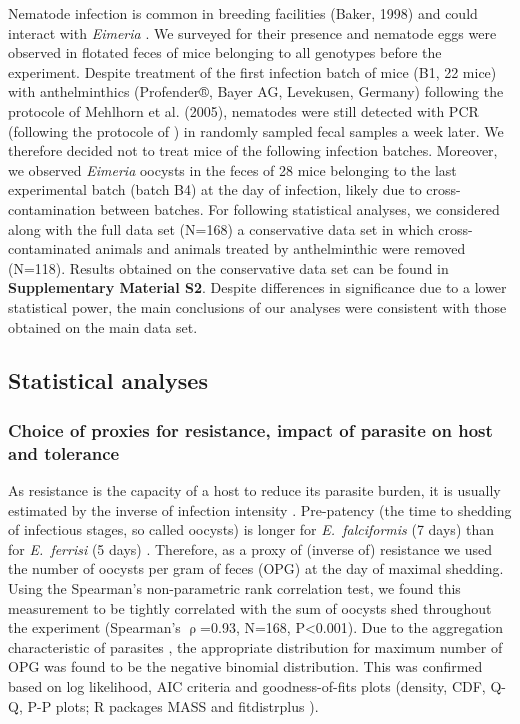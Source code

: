 \documentclass[12pt]{article}
\begin{document}
Nematode infection is common in breeding facilities (Baker, 1998) and could interact with \textit{Eimeria} \citep{clerc_parasitic_2019}. We surveyed for their presence and nematode eggs were observed in flotated feces of mice belonging to all genotypes before the experiment. Despite treatment of the first infection batch of mice (B1, 22 mice) with anthelminthics (Profender®, Bayer AG, Levekusen, Germany) following the protocole of Mehlhorn et al. (2005), nematodes were still detected with PCR (following the protocole of \cite{floyd_nematode-specific_2005}) in randomly sampled fecal samples a week later. We therefore decided not to treat mice of the following infection batches. Moreover, we observed \textit{Eimeria }oocysts in the feces of 28 mice belonging to the last experimental batch (batch B4) at the day of infection, likely due to cross-contamination between batches. For following statistical analyses, we considered along with the full data set (N=168) a conservative data set in which cross-contaminated animals and animals treated by anthelminthic were removed (N=118). Results obtained on the conservative data set can be found in \textbf{Supplementary Material S2}. Despite differences in significance due to a lower statistical power, the main conclusions of our analyses were consistent with those obtained on the main data set.\par

\subsection{Statistical analyses}

\subsubsection{Choice of proxies for resistance, impact of parasite on host and tolerance}
As resistance is the capacity of a host to reduce its parasite burden, it is usually estimated by the inverse of infection intensity \citep{raaberg_decomposing_2009}. Pre-patency (the time to shedding of infectious stages, so called oocysts) is longer for \textit{E.~falciformis} (7 days) than for \textit{E.~ferrisi} (5 days) \citep{al-khlifeh_eimeria_2019}. Therefore, as a proxy of (inverse of) resistance we used the number of oocysts per gram of feces (OPG) at the day of maximal shedding. Using the Spearman's non-parametric rank correlation test, we found this measurement to be tightly correlated with the sum of oocysts shed throughout the experiment (Spearman's $\uprho$=0.93, N=168, P<0.001). Due to the aggregation characteristic of parasites \citep{shaw_patterns_1995}, the appropriate distribution for maximum number of OPG was found to be the negative binomial distribution. This was confirmed based on log likelihood, AIC criteria and goodness-of-fits plots (density, CDF, Q-Q, P-P plots; R packages MASS \citep{venables_modern_2002} and fitdistrplus \citep{delignette-muller_fitdistrplus_2015}). \par
\end{document}
